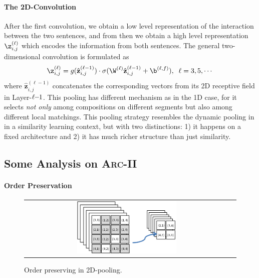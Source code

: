 \documentclass{article} %
\begin{document}
\paragraph{The 2D-Convolution} After the first convolution, we obtain a low level representation of the interaction between the two sentences, and from then we obtain a high level representation $\z^{(\ell )}_{i,j}$ which encodes the information from both sentences. The general two-dimensional convolution is formulated as
\begin{equation}
\z^{(\ell)}_{i,j} =  g(\hat{\mathbf{z}}^{(\ell-1)}_{i,j})\cdot \sigma(\W^{(\ell)} \hat{\mathbf{z}}^{(\ell-1)}_{i,j} + \b^{(\ell,f)}), \;\;\ell = 3,5,\cdots
\end{equation}
where $ \hat{\mathbf{z}}^{(\ell-1)}_{i,j}$ concatenates the corresponding vectors from its 2D receptive field in Layer-$\ell\hspace{-3pt}-\hspace{-3pt}1$. This pooling has different mechanism as in the 1D case, for it selects \emph{not only} among compositions on different segments but also among different local matchings. This pooling strategy resembles the dynamic pooling in \cite{socher2011} in a similarity learning context, but with two distinctions: 1) it happens on a fixed architecture and 2) it has much richer structure than just similarity.


\subsection{Some Analysis on \textsc{Arc-II}}\vspace{-5pt}
\paragraph{Order Preservation}
\begin{figure}
\begin{center}
    \begin{tabular}[c]{cc}
     \includegraphics[width=0.5\textwidth]{pics/pooling.png} %
    \end{tabular}
    \caption{Order preserving in 2D-pooling.} %
    \label{f:order}
  \end{center}
\vspace{-10pt}
\end{figure}
\end{document}
